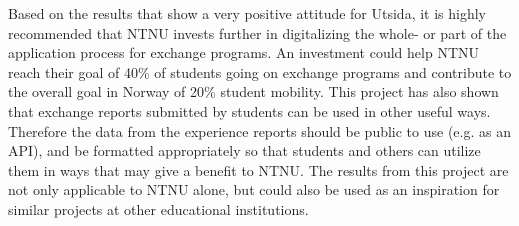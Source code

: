 Based on the results that show a very positive attitude for Utsida, it is highly recommended that NTNU invests further in digitalizing the whole- or part of the application process for exchange programs. An investment could help NTNU reach their goal of 40\% of students going on exchange programs and contribute to the overall goal in Norway of 20\% student mobility. This project has also shown that exchange reports submitted by students can be used in other useful ways. Therefore the data from the experience reports should be public to use (e.g. as an API), and be formatted appropriately so that students and others can utilize them in ways that may give a benefit to NTNU. The results from this project are not only applicable to NTNU alone, but could also be used as an inspiration for similar projects at other educational institutions. 